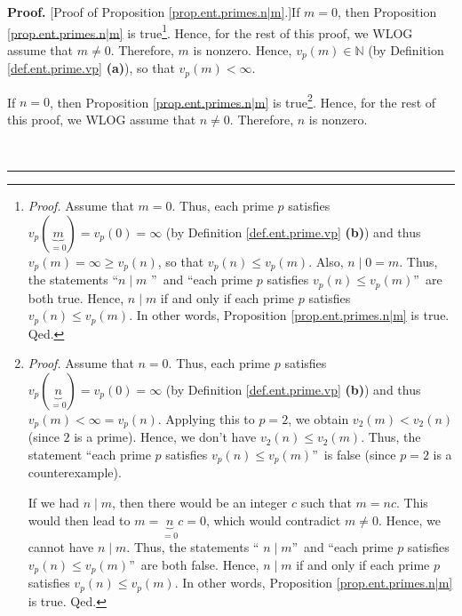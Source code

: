 \documentclass[numbers=enddot,12pt,final,onecolumn,notitlepage]{scrartcl}%
\numberwithin{exer}{subsection}
\theoremstyle{definition}
\newenvironment{proof}[1][Proof]{\noindent\textbf{#1.} }{\ \rule{0.5em}{0.5em}}
\begin{document}
\begin{proof}
[Proof of Proposition \ref{prop.ent.primes.n|m}.]If $m=0$, then Proposition
\ref{prop.ent.primes.n|m} is true\footnote{\textit{Proof.} Assume that $m=0$.
Thus, each prime $p$ satisfies $v_{p}\left(  \underbrace{m}_{=0}\right)
=v_{p}\left(  0\right)  =\infty$ (by Definition \ref{def.ent.prime.vp}
\textbf{(b)}) and thus $v_{p}\left(  m\right)  =\infty\geq v_{p}\left(
n\right)  $, so that $v_{p}\left(  n\right)  \leq v_{p}\left(  m\right)  $.
Also, $n\mid0=m$. Thus, the statements \textquotedblleft$n\mid m$%
\textquotedblright\ and \textquotedblleft each prime $p$ satisfies
$v_{p}\left(  n\right)  \leq v_{p}\left(  m\right)  $\textquotedblright\ are
both true. Hence, $n\mid m$ if and only if each prime $p$ satisfies
$v_{p}\left(  n\right)  \leq v_{p}\left(  m\right)  $. In other words,
Proposition \ref{prop.ent.primes.n|m} is true. Qed.}. Hence, for the rest of
this proof, we WLOG assume that $m\neq0$. Therefore, $m$ is nonzero. Hence,
$v_{p}\left(  m\right)  \in\mathbb{N}$ (by Definition \ref{def.ent.prime.vp}
\textbf{(a)}), so that $v_{p}\left(  m\right)  <\infty$.

If $n=0$, then Proposition \ref{prop.ent.primes.n|m} is
true\footnote{\textit{Proof.} Assume that $n=0$. Thus, each prime $p$
satisfies $v_{p}\left(  \underbrace{n}_{=0}\right)  =v_{p}\left(  0\right)
=\infty$ (by Definition \ref{def.ent.prime.vp} \textbf{(b)}) and thus
$v_{p}\left(  m\right)  <\infty=v_{p}\left(  n\right)  $. Applying this to
$p=2$, we obtain $v_{2}\left(  m\right)  <v_{2}\left(  n\right)  $ (since $2$
is a prime). Hence, we don't have $v_{2}\left(  n\right)  \leq v_{2}\left(
m\right)  $. Thus, the statement \textquotedblleft each prime $p$ satisfies
$v_{p}\left(  n\right)  \leq v_{p}\left(  m\right)  $\textquotedblright\ is
false (since $p=2$ is a counterexample).
\par
If we had $n\mid m$, then there would be an integer $c$ such that $m=nc$. This
would then lead to $m=\underbrace{n}_{=0}c=0$, which would contradict $m\neq
0$. Hence, we cannot have $n\mid m$. Thus, the statements \textquotedblleft%
$n\mid m$\textquotedblright\ and \textquotedblleft each prime $p$ satisfies
$v_{p}\left(  n\right)  \leq v_{p}\left(  m\right)  $\textquotedblright\ are
both false. Hence, $n\mid m$ if and only if each prime $p$ satisfies
$v_{p}\left(  n\right)  \leq v_{p}\left(  m\right)  $. In other words,
Proposition \ref{prop.ent.primes.n|m} is true. Qed.}. Hence, for the rest of
this proof, we WLOG assume that $n\neq0$. Therefore, $n$ is nonzero.


\end{proof}
\end{document}
